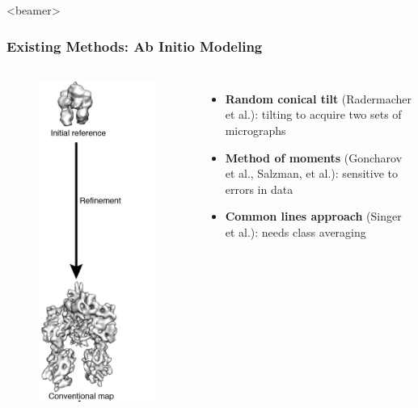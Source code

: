 \documentclass{beamer}
\begin{document}
\begin{frame}<beamer>
\frametitle{Existing Methods: Ab Initio Modeling}
\begin{columns}
\begin{figure}
\centering
\includegraphics[width=.7 \columnwidth]{figures/refinement.png}
\end{figure}
\begin{itemize}
 \item \textbf{Random conical tilt} (Radermacher et al.): tilting to acquire two sets of micrographs
 \item \textbf{Method of moments} (Goncharov et al., Salzman, et al.): sensitive to errors in data
 \item \textbf{Common lines approach} (Singer et al.): needs class averaging
\end{itemize}
\end{columns}
\end{frame}
\end{document}
